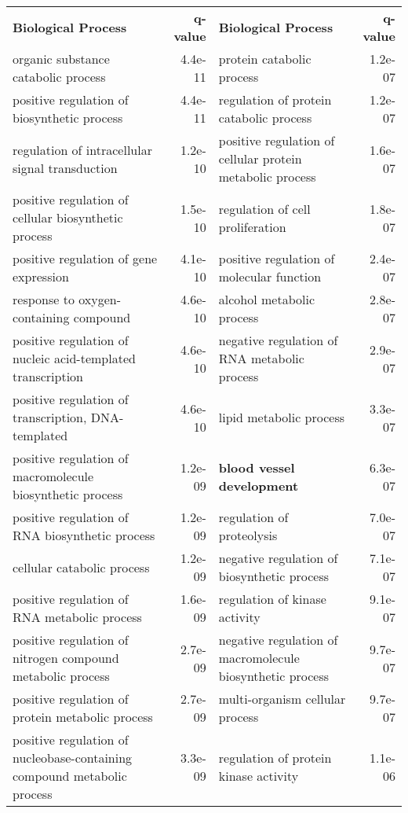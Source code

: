 \documentclass[fleqn,10pt]{SelfArx} %
\begin{document}
\begin{table}[!htb]
	\centering
	\scriptsize
	\begin{tabularx}{\textwidth}{lRlR}
		\textbf{\color{white} Biological Process} & \textbf{\color{white} q-value} & \textbf{\color{white} Biological Process} & \textbf{\color{white} q-value}\\
		organic substance catabolic process & 4.4e-11 & protein catabolic process & 1.2e-07 \\ 
		positive regulation of biosynthetic process & 4.4e-11 & regulation of protein catabolic process & 1.2e-07 \\ 
		regulation of intracellular signal transduction & 1.2e-10 & positive regulation of cellular protein metabolic process & 1.6e-07 \\ 
		positive regulation of cellular biosynthetic process & 1.5e-10 & regulation of cell proliferation & 1.8e-07 \\ 
		positive regulation of gene expression & 4.1e-10 & positive regulation of molecular function & 2.4e-07 \\ 
		response to oxygen-containing compound & 4.6e-10 & alcohol metabolic process & 2.8e-07 \\ 
		positive regulation of nucleic acid-templated transcription & 4.6e-10 & negative regulation of RNA metabolic process & 2.9e-07 \\ 
		positive regulation of transcription, DNA-templated & 4.6e-10 & lipid metabolic process & 3.3e-07 \\ 
		positive regulation of macromolecule biosynthetic process & 1.2e-09 & \textbf{blood vessel development} & 6.3e-07 \\ 
		positive regulation of RNA biosynthetic process & 1.2e-09 & regulation of proteolysis & 7.0e-07 \\ 
		cellular catabolic process & 1.2e-09 & negative regulation of biosynthetic process & 7.1e-07 \\ 
		positive regulation of RNA metabolic process & 1.6e-09 & regulation of kinase activity & 9.1e-07 \\ 
		positive regulation of nitrogen compound metabolic process & 2.7e-09 & negative regulation of macromolecule biosynthetic process & 9.7e-07 \\ 
		positive regulation of protein metabolic process & 2.7e-09 & multi-organism cellular process & 9.7e-07 \\ 
		positive regulation of nucleobase-containing compound metabolic process & 3.3e-09 & regulation of protein kinase activity & 1.1e-06 \\ 

\end{tabularx}
\end{table}
\end{document}
